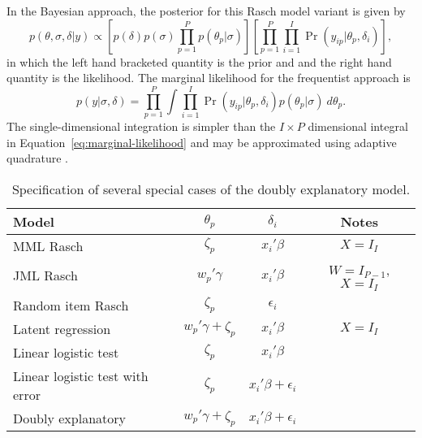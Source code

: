 \documentclass[12pt, letterpaper]{article}
\begin{document}
In the Bayesian approach, the posterior for this Rasch model variant is given by
\begin{equation}
	p(\theta, \sigma, \delta | y) \propto
	\left [
		p(\delta) 	p(\sigma)
		\prod_{p=1}^P p(\theta_p | \sigma)
	\right ]
	\left [
		\prod_{p=1}^P \prod_{i=1}^I
		\Pr ( y_{ip} | \theta_p, \delta_i)
	\right ]
,\end{equation}
in which the left hand bracketed quantity is the prior and and the right hand quantity is the likelihood. The marginal likelihood for the frequentist approach is
\begin{equation}
	p(y | \sigma, \delta) =
	\prod_{p=1}^P
	\int
		\prod_{i=1}^I
		\Pr(y_{ip} | \theta_p, \delta_i)
		p(\theta_p | \sigma)
	~d \theta_p
.\end{equation}
The single-dimensional integration is simpler than the $I \times P$ dimensional integral in Equation~\ref{eq:marginal-likelihood} and may be approximated using adaptive quadrature \parencite{rabe2002reliable}.

\begin{table}
	\centering
	\begin{tabular}{lccc}
		\hline
		Model	& $\theta_p$ & $\delta_i$ & Notes \\ \hline
		MML Rasch
			& $\zeta_p$ & $x_i'\beta$ & $X = I_I$ \\
		JML Rasch
			& $w_p' \gamma$ & $x_i'\beta$ & $W = I_{P-1}$, $X = I_I$ \\
		Random item Rasch
			& $\zeta_p$ & $\epsilon_i$ &  \\
		Latent regression
			& $w_p' \gamma + \zeta_p$ & $x_i'\beta$ & $X = I_I$ \\
		Linear logistic test
			& $\zeta_p$ & $x_i'\beta$ &  \\
		Linear logistic test with error
			& $\zeta_p$ & $x_i'\beta + \epsilon_i$ &  \\
		Doubly explanatory
			& $w_p' \gamma + \zeta_p$ &  $x_i'\beta + \epsilon_i$ & \\
		\hline
	\end{tabular}
	\caption[Specification of several special cases of the doubly explanatory model]
	{Specification of several special cases of the doubly explanatory model.}
	\label{tab:special-cases}
\end{table}
\end{document}
